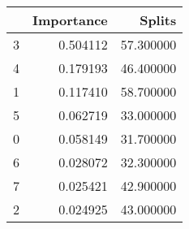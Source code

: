 \begin{tabular}{lrr}
\toprule
 & Importance & Splits \\
\midrule
3 & 0.504112 & 57.300000 \\
4 & 0.179193 & 46.400000 \\
1 & 0.117410 & 58.700000 \\
5 & 0.062719 & 33.000000 \\
0 & 0.058149 & 31.700000 \\
6 & 0.028072 & 32.300000 \\
7 & 0.025421 & 42.900000 \\
2 & 0.024925 & 43.000000 \\
\bottomrule
\end{tabular}